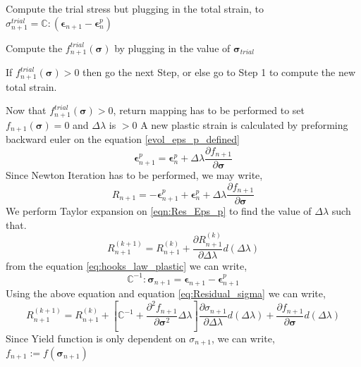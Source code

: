  \begin{steps}
 	\item Compute the trial stress but plugging in the total strain, to\\ $\sigma^{trial}_{n+1}=\mathbb C : (\bm \epsilon_{n+1}-\bm \epsilon_{n}^p)$
 	\item Compute the $f^{trial}_{n+1}(\bm \sigma)$ by plugging in the value of $\bm \sigma_{trial}$
 	\item If $f^{trial}_{n+1}(\bm \sigma)>0$ then go the next Step, or else go to Step 1 to compute the new total strain.
 	\item Now that $f^{trial}_{n+1}(\bm \sigma)>0$, return mapping has to be performed to set $f_{n+1}(\bm \sigma)=0$ and $\Delta \lambda$ is $>0$ A new plastic strain is calculated by preforming backward euler on the equation \ref{evol_eps_p_defined}
 	\begin{equation}
 	\bm\epsilon^p_{n+1}=\bm\epsilon^p_{n}+\Delta\lambda \frac{\partial f_{n+1}}{\partial \bm \sigma}
 	\end{equation}
 	Since Newton Iteration has to be performed, we may write,
 	\begin{equation}
 	R_{n+1}=-\bm\epsilon^p_{n+1}+\bm\epsilon^p_{n}+\Delta\lambda \frac{\partial f_{n+1}}{\partial \bm \sigma}
 	\label{eqn:Res_Eps_p}
 	\end{equation}
 	  We perform Taylor expansion on \ref{eqn:Res_Eps_p} to find the value of $\Delta \lambda$ such that.
 	\begin{equation}
 	R^{(k+1)}_{n+1}=R^{(k)}_{n+1} + \frac{\partial R^{(k)}_{n+1} }{\partial \Delta \lambda} d(\Delta \lambda)
 	\label{eq:Residual_sigma}
 	\end{equation}
 	from the equation \ref{eq:hooks_law_plastic} we can write,
 	\begin{equation}
 	\mathbb C^{-1}: \bm \sigma_{n+1}=\bm{\epsilon}_{n+1}-\bm\epsilon^p_{n+1}
 	\end{equation}
 	Using the above equation and equation \ref{eq:Residual_sigma} we can write,
 	\begin{equation}
 		R^{(k+1)}_{n+1}=R^{(k)}_{n+1} +
 		\left[\mathbb C^{-1}+\frac{\partial^2 f_{n+1}}{\partial \bm \sigma^2} \Delta\lambda\right] 
 		\frac{\partial \sigma_{n+1}}{\partial \Delta \lambda}d(\Delta \lambda)
 		+ \frac{\partial f_{n+1}}{\partial \bm \sigma}d(\Delta \lambda)
 		\label{eq:Residual_sigma_2} 
 	\end{equation}
 	Since Yield function is only dependent on $\sigma_{n+1}$, we can write, $f_{n+1}:=f(\bm \sigma_{n+1})$
 	 

\end{steps}
